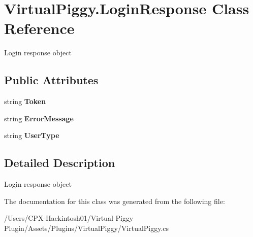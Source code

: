 \hypertarget{class_virtual_piggy_1_1_login_response}{\section{Virtual\-Piggy.\-Login\-Response Class Reference}
\label{class_virtual_piggy_1_1_login_response}
}


Login response object  


\subsection*{Public Attributes}
\begin{DoxyCompactItemize}
\item 
\hypertarget{class_virtual_piggy_1_1_login_response_a889c215d8f5d8a8586f49d9adf486997}{string {\bfseries Token}}\label{class_virtual_piggy_1_1_login_response_a889c215d8f5d8a8586f49d9adf486997}

\item 
\hypertarget{class_virtual_piggy_1_1_login_response_ae8a1614599cdbc1b0cfd98e7c40f780b}{string {\bfseries Error\-Message}}\label{class_virtual_piggy_1_1_login_response_ae8a1614599cdbc1b0cfd98e7c40f780b}

\item 
\hypertarget{class_virtual_piggy_1_1_login_response_acbae2fa63321be3f8f111eac5c4205d8}{string {\bfseries User\-Type}}\label{class_virtual_piggy_1_1_login_response_acbae2fa63321be3f8f111eac5c4205d8}

\end{DoxyCompactItemize}


\subsection{Detailed Description}
Login response object 



The documentation for this class was generated from the following file\-:\begin{DoxyCompactItemize}
\item 
/\-Users/\-C\-P\-X-\/\-Hackintosh01/\-Virtual Piggy Plugin/\-Assets/\-Plugins/\-Virtual\-Piggy/Virtual\-Piggy.\-cs\end{DoxyCompactItemize}
